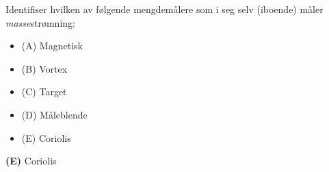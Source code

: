 

Identifiser hvilken av følgende mengdemålere som i seg selv (iboende) måler {\it masse}strømning:

\begin{itemize}
\item{(A)} Magnetisk
\vskip 5pt 
\item{(B)} Vortex
\vskip 5pt 
\item{(C)} Target
\vskip 5pt 
\item{(D)} Måleblende
\vskip 5pt 
\item{(E)} Coriolis
\end{itemize}







{\bf (E)} Coriolis
 







